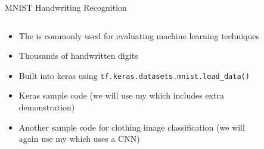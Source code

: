\documentclass{beamer}
\newcommand{\blue}[1]{\color{blue}{#1}}
\begin{document}
	\begin{frame}{MNIST Handwriting Recognition}
	\begin{columns}
	\begin{column}{0.7\textwidth}
	\begin{itemize}
		\item The \href{http://yann.lecun.com/exdb/mnist/}{\blue{MNIST dataset}} is commonly used for evaluating machine learning techniques
		\item Thousands of handwritten digits
		\item Built into keras using \lstinline|tf.keras.datasets.mnist.load_data()|
		\item Keras sample code \href{https://www.tensorflow.org/tutorials/quickstart/beginner}{\blue{here}} (we will use my \href{https://colab.research.google.com/drive/170ejXXwx5x_0gOyYo_3KaOu-NwLzHaA5}{\blue{modified version}} which includes extra demonstration)
		\item Another sample code for clothing image classification \href{https://www.tensorflow.org/tutorials/keras/classification}{\blue{here}} (we will again use my \href{https://colab.research.google.com/drive/1JPLrS8sYrfCCWXRtW5xDcgqFJoVAfhdJ}{\blue{modified version}} which uses a CNN)
	\end{itemize}
	\end{column}
	\begin{column}{0.3\textwidth}
		\begin{figure}

\end{figure}
\end{column}
\end{columns}
\end{frame}
\end{document}
